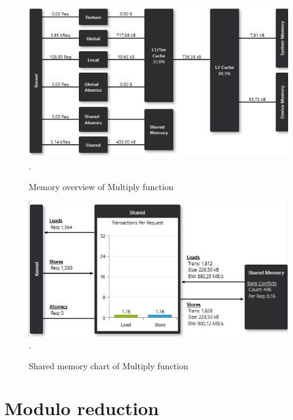 \documentclass[oneside,openright,12pt,final,en]{mgr}
\begin{document}
\begin{figure}[H]
	\centering
	\includegraphics[width=\textwidth]{mull_memory}.
	\caption{Memory overview of Multiply function}
	\label{fig:multiply_memory}
\end{figure}

\begin{figure}[H]
	\centering
	\includegraphics[width=\textwidth]{mull_shared}.
	\caption{Shared memory chart of Multiply function}
	\label{fig:multiply_shared}
\end{figure}


\section{Modulo reduction}
\end{document}
